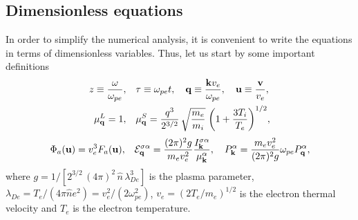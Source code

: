 \documentclass[12pt,a4paper,ruledheader]{report}
\def\calE{{\cal E}}
\begin{document}
\subsection{Dimensionless equations}
In order to simplify the numerical analysis, it is convenient to write
the equations in terms of dimensionless variables. Thus, let us start
by some important definitions
\begin{align*}
  z\equiv \frac{\omega}{\omega_{pe}},
  & \quad \tau\equiv \omega_{pe}t, \quad
    {\bf q}\equiv \frac{{\bf k}v_e}{\omega_{pe}}, \quad
    {\bf u}\equiv \frac{\bf v}{v_e},\\
  \mu_{\bf q}^L
  = 1,&\quad\mu_{\bf q}^S = \frac{q^3}{2^{3/2}}
	\,\sqrt{\frac{m_e}{m_i}}\;\biggl(1+\frac{3T_i}{T_e}\biggr)^{1/2},
\end{align*}
\begin{align*}
  \Phi_a({\bf u})=  v_e^3 F_a({\bf u}),& \quad
    \calE_{\bf q}^{\sigma\alpha}= \frac{(2\pi)^2 g}{m_ev_e^2}
    \frac{I_{\bf k}^{\sigma\alpha}}{\mu_{\bf k}^\alpha},\quad
    P_{\bf k}^\alpha=\frac{m_ev_e^2}{(2\pi)^2g}\omega_{pe}P_{\bf q}^\alpha,\\
\end{align*}
where $g=1/[2^{3/2}\,(4\pi)^2\,\hat{n}\,\lambda_{De}^3]$ is the
plasma parameter, $\lambda_{De}=T_e/(4\pi\hat{n}e^2)=v_e^2/(2\omega_{pe}^2)$,
$v_e=(2T_e/m_e)^{1/2}$ is the electron thermal velocity and $T_e$ is the
electron temperature.
\end{document}

